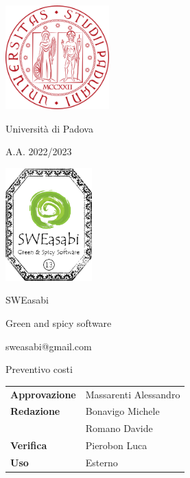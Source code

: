 \documentclass{article}
\begin{document}
\begin{center}
    
    \includegraphics[width=0.3\textwidth]{../../assets_globali/img/logo_unipd.png}

    Università di Padova
    
    A.A. 2022/2023
    
    \vspace{4cm}

    \includegraphics[width=0.25\textwidth]{../../assets_globali/img/logo_13.png}
    
    \Large SWEasabi

    \tiny Green and spicy software

    \small sweasabi@gmail.com
        
    \vspace{2cm}

    \Huge Preventivo costi
        
    \vspace{2cm}
    
    \normalsize
    \begin{center}
        \begin{tabularx}{7cm}{l | X}            
            \textbf{Approvazione} & Massarenti Alessandro\\
            \textbf{Redazione} & Bonavigo Michele \\
            & Romano Davide\\
            \textbf{Verifica} & Pierobon Luca\\
            \hline
            \textbf{Uso} & Esterno\\
        \end{tabularx}
    \end{center}
        
\end{center}

\newpage

\tableofcontents

\newpage


\end{document}
